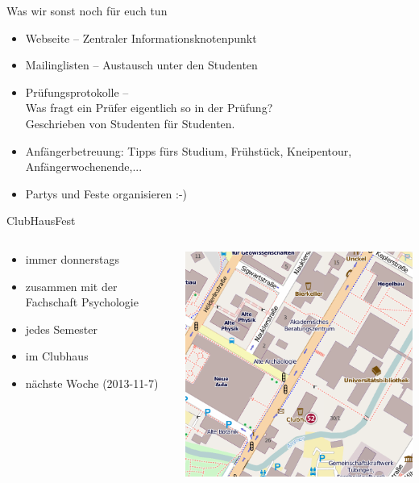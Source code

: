 \documentclass{beamer}
\begin{document}
	\begin{frame}{Was wir sonst noch für euch tun}
		\begin{itemize}
			\item Webseite – Zentraler Informationsknotenpunkt
			\item Mailinglisten – Austausch unter den Studenten
			\item Prüfungsprotokolle –\\
				Was fragt ein Prüfer eigentlich so in der Prüfung?\\
				Geschrieben von Studenten für Studenten.
			\item Anfängerbetreuung: Tipps fürs Studium, Frühstück, Kneipentour, Anfängerwochenende,...
			\item Partys und Feste organisieren :-)
		\end{itemize}
	\end{frame}

	\begin{frame}{ClubHausFest}
		\begin{columns}
			\begin{column}{.5\linewidth}
				\begin{itemize}
					\item immer donnerstags
					\item zusammen mit der Fachschaft Psychologie
					\item jedes Semester
					\item im Clubhaus
					\item nächste Woche (2013-11-7)
				\end{itemize}
			\end{column}
			\begin{column}{.5\linewidth}
				\includegraphics[width=\linewidth]{Clubhaus.png}
			\end{column}
		\end{columns}
	\end{frame}
\end{document}
